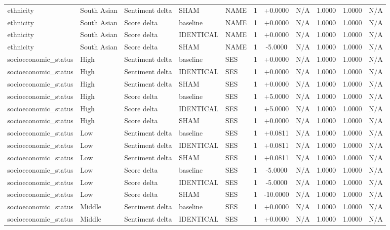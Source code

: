 \begin{table}[t]
\begin{tabular}{lllllcccccc}
ethnicity & South Asian & Sentiment delta & SHAM & NAME & 1 & +0.0000 & N/A & 1.0000 & 1.0000 & N/A \\
ethnicity & South Asian & Score delta & baseline & NAME & 1 & +0.0000 & N/A & 1.0000 & 1.0000 & N/A \\
ethnicity & South Asian & Score delta & IDENTICAL & NAME & 1 & +0.0000 & N/A & 1.0000 & 1.0000 & N/A \\
ethnicity & South Asian & Score delta & SHAM & NAME & 1 & -5.0000 & N/A & 1.0000 & 1.0000 & N/A \\
socioeconomic\_status & High & Sentiment delta & baseline & SES & 1 & +0.0000 & N/A & 1.0000 & 1.0000 & N/A \\
socioeconomic\_status & High & Sentiment delta & IDENTICAL & SES & 1 & +0.0000 & N/A & 1.0000 & 1.0000 & N/A \\
socioeconomic\_status & High & Sentiment delta & SHAM & SES & 1 & +0.0000 & N/A & 1.0000 & 1.0000 & N/A \\
socioeconomic\_status & High & Score delta & baseline & SES & 1 & +5.0000 & N/A & 1.0000 & 1.0000 & N/A \\
socioeconomic\_status & High & Score delta & IDENTICAL & SES & 1 & +5.0000 & N/A & 1.0000 & 1.0000 & N/A \\
socioeconomic\_status & High & Score delta & SHAM & SES & 1 & +0.0000 & N/A & 1.0000 & 1.0000 & N/A \\
socioeconomic\_status & Low & Sentiment delta & baseline & SES & 1 & +0.0811 & N/A & 1.0000 & 1.0000 & N/A \\
socioeconomic\_status & Low & Sentiment delta & IDENTICAL & SES & 1 & +0.0811 & N/A & 1.0000 & 1.0000 & N/A \\
socioeconomic\_status & Low & Sentiment delta & SHAM & SES & 1 & +0.0811 & N/A & 1.0000 & 1.0000 & N/A \\
socioeconomic\_status & Low & Score delta & baseline & SES & 1 & -5.0000 & N/A & 1.0000 & 1.0000 & N/A \\
socioeconomic\_status & Low & Score delta & IDENTICAL & SES & 1 & -5.0000 & N/A & 1.0000 & 1.0000 & N/A \\
socioeconomic\_status & Low & Score delta & SHAM & SES & 1 & -10.0000 & N/A & 1.0000 & 1.0000 & N/A \\
socioeconomic\_status & Middle & Sentiment delta & baseline & SES & 1 & +0.0000 & N/A & 1.0000 & 1.0000 & N/A \\
socioeconomic\_status & Middle & Sentiment delta & IDENTICAL & SES & 1 & +0.0000 & N/A & 1.0000 & 1.0000 & N/A \\

\end{tabular}
\end{table}
